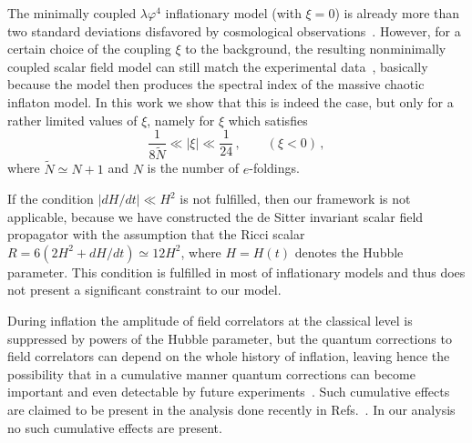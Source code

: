 \documentclass[aps,12pt,superscriptaddress,preprintnumbers,
                secnumarabic,nofootinbib,showpacs]{revtex4}
\begin{document}
The minimally coupled ${\lambda\varphi^4}$ inflationary model
(with $\xi=0$) is already more than two standard deviations
disfavored by cosmological observations~\cite{Spergel:2006}.
However, for a certain choice of the coupling $\xi$ to the
background, the resulting nonminimally coupled scalar field model
can still match the experimental data~\cite{HwangNoh:1998,
KomatsuFutamase:1999, FakirUnruh:1990,Tsujikawa:2004my}, 
basically because
the model then produces the spectral index of
the massive chaotic inflaton model.
In this work we show that this is indeed the case,
but only for a rather limited values of $\xi$, namely for $\xi$ which satisfies
\begin{equation}
\frac{1}{8\tilde{N}}\ll |\xi | \ll\frac{1}{24}\,,\qquad (\xi<0) \,,
\label{condition on neg xi}
\end{equation}
where $\tilde{N}\simeq N+1$ and $N$ is the number of $e$-foldings.

If the condition $|dH/dt| \ll H^2$ is not
fulfilled, then our framework is not applicable, because we have
constructed the de Sitter invariant scalar field propagator with the
assumption that the Ricci scalar 
$R = 6(2H^2+d{H}/dt) \simeq 12H^2$, where $H=H(t)$ denotes the 
Hubble parameter. This condition is
fulfilled in most of inflationary models and thus does not present
a significant constraint to our model.

During inflation the amplitude of field correlators at the classical
level is suppressed by powers of the Hubble parameter, but the quantum
corrections to field correlators can depend on the whole history
of inflation, leaving hence the possibility that in a cumulative
manner quantum corrections can become important and even
detectable by future
experiments~\cite{BoyanovskydeVegaSanchez:2006,BoyanovskydeVegaSanchez:2005,Boyanovsky:2004ph,Weinberg:2005,Weinberg:2006}.
Such cumulative effects are claimed to be present in the analysis done
recently in Refs.~\cite{Sloth:2006az,Sloth:2006nu}. In our
analysis no such cumulative effects are present.
\end{document}
